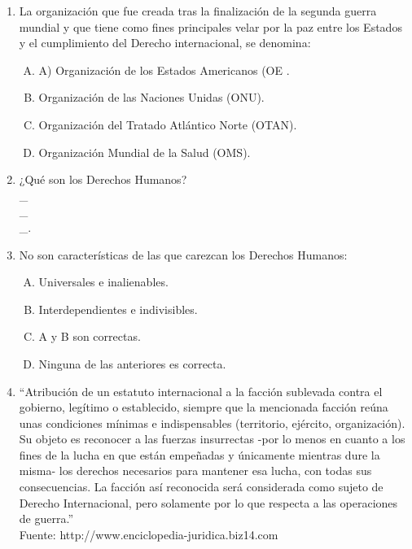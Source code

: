 \begin{enumerate}

\item La organización que fue creada tras la finalización de la segunda guerra mundial y que tiene como fines principales velar por la paz entre los Estados y el cumplimiento del Derecho internacional, se denomina:\label{sociii-1}


\begin{enumerate}[(A)]
\item A) Organización de los Estados Americanos (OE .
 \item  Organización de las Naciones Unidas (ONU).
\item Organización del Tratado Atlántico Norte (OTAN).
\item Organización Mundial de la Salud (OMS).
\end{enumerate}


\item ¿Qué son los Derechos Humanos?\label{sociii-3}
\hrulefill\\
\_\hrulefill\\
\_\hrulefill\\
\_\hrulefill.


\item No son características de las que carezcan los Derechos Humanos:\label{sociii-4}


\begin{enumerate}[(A)]
\item   Universales e inalienables.
 \item  Interdependientes e indivisibles.
\item A y B son correctas.
\item Ninguna de las anteriores es correcta.
\end{enumerate}



\newpage
\item ``Atribución de un estatuto internacional a la facción sublevada contra el gobierno, legítimo o establecido, siempre que la mencionada facción reúna unas condiciones mínimas e indispensables (territorio, ejército, organización). Su objeto es reconocer a las fuerzas insurrectas -por lo menos en cuanto a los fines de la lucha en que están empeñadas y únicamente mientras dure la misma- los derechos necesarios para mantener esa lucha, con todas sus consecuencias. La facción así reconocida será considerada como sujeto de Derecho Internacional, pero solamente por lo que respecta a las operaciones de guerra.''
\\{\footnotesize Fuente: http://www.enciclopedia-juridica.biz14.com}



\end{enumerate}
